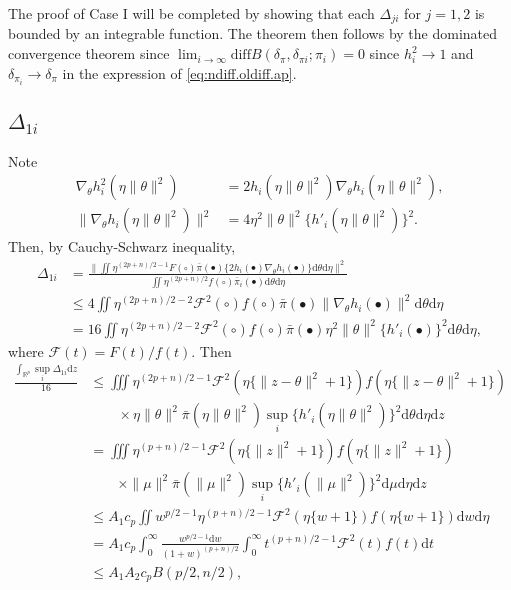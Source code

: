 \documentclass[preprint,11pt]{imsart}
\numberwithin{equation}{section}
\theoremstyle{plain}
\theoremstyle{definition}
\theoremstyle{remark}
\newcommand{\rd}{\mathrm{d}}
\newcommand{\ndiff}{\mathrm{diff}B}
\begin{document}
The proof of Case I will be completed by showing that each $\Delta_{ji}$ for $j=1,2$ is
bounded by an integrable function. The theorem then follows by
the dominated convergence theorem since
$\lim_{i\to\infty}\ndiff(\delta_\pi,\delta_{\pi i};\pi_i) =0$ since $h_i^2\to 1$
and $\delta_{\pi_i}\to \delta_\pi$ in the expression of \eqref{eq:ndiff.oldiff.ap}.

 \subsection{$\Delta_{1i}$}
\label{sec:del1}
Note
\begin{align*}
\nabla_\theta h_i^2(\eta\|\theta\|^2)&=2 h_i(\eta\|\theta\|^2)\nabla_\theta h_i(\eta\|\theta\|^2), \\
 \|\nabla_\theta h_i(\eta\|\theta\|^2)\|^2
 &=4\eta^2\|\theta\|^2\{h'_i(\eta\|\theta\|^2)\}^2.
\end{align*}
Then, by Cauchy-Schwarz inequality,
\begin{align*}
\Delta_{1i}&=\frac{\|\iint 
  \eta^{(2p+n)/2-1}  F(\circ)
 \bar{\pi}(\bullet)\{2h_i(\bullet)\nabla_\theta h_i(\bullet)\} \rd \theta   \rd \eta\|^2}
 {\iint\eta^{(2p+n)/2} f(\circ) \bar{\pi}_i(\bullet) \rd \theta   \rd \eta} \\
&\leq 4\iint 
  \eta^{(2p+n)/2-2} \mathcal{F}^2(\circ) f(\circ) 
\bar{\pi}(\bullet)\|\nabla_\theta h_i(\bullet)\|^2 \rd \theta   \rd \eta \\
&=16\iint 
  \eta^{(2p+n)/2-2} \mathcal{F}^2(\circ) f(\circ) 
\bar{\pi}(\bullet)\eta^2 \|\theta\|^2 \{h'_i(\bullet)\}^2  \rd \theta   \rd \eta,
\end{align*}
where $\mathcal{F}(t)=F(t)/f(t)$.
Then
\begin{align*}
\frac{\int_{\mathbb{R}^p}\sup_i\Delta_{1i} \rd z}{16} 
 &\leq
 \iiint 
 \eta^{(2p+n)/2-1} \mathcal{F}^2(\eta\{\|z-\theta\|^2+1\})
 f(\eta\{\|z-\theta\|^2+1\}) \\
 &\qquad \times\eta\|\theta\|^2\bar{\pi}(\eta\|\theta\|^2)\sup_i\{h'_i(\eta\|\theta\|^2)\}^2
 \rd \theta   \rd \eta  \rd  z \\
 &
= \iiint  \eta^{(p+n)/2-1} \mathcal{F}^2(\eta\{\|z\|^2+1\})
 f(\eta\{\|z\|^2+1\}) \\
 &\qquad \times\|\mu\|^2\bar{\pi}(\|\mu\|^2)\sup_i\{h'_i(\|\mu\|^2)\}^2
 \rd \mu   \rd \eta  \rd  z \\
 &
\leq A_1c_p  \iint w^{p/2-1}
 \eta^{(p+n)/2-1} \mathcal{F}^2(\eta\{w+1\}) f(\eta\{w+1\}) \rd  w  \rd \eta \\
 &= A_1c_p \int_0^\infty \frac{w^{p/2-1} \rd w}{(1+w)^{(p+n)/2}}
 \int_0^\infty t^{(p+n)/2-1} \mathcal{F}^2(t) f(t)  \rd t \\
 &\leq A_1A_2 c_p  B(p/2,n/2), 
\end{align*}
\end{document}
